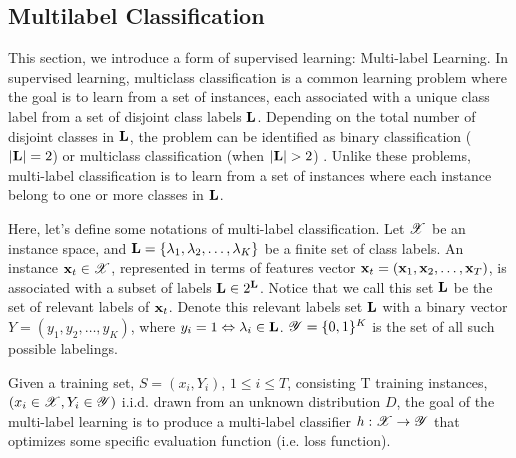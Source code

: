 \subsection{Multilabel Classification}
\label{subsec:multilabel}

This section, we introduce a form of supervised learning: Multi-label Learning. In supervised learning, multiclass classification is a common learning problem where the goal is to learn from a set of instances, each associated with a unique class label from a set of disjoint class labels $\mathbf{L}$. Depending on the total number of disjoint classes in $\mathbf{L}$, the problem can be identified as binary classification ($|\mathbf{L}| = 2$) or multiclass classification (when $|\mathbf{L}| >2$) . Unlike these problems, multi-label classification is to learn from a set of instances where each instance belong to one or more classes in $\mathbf{L}$. 

Here, let's define some notations of multi-label classification. Let $\mathscr{X}$ be an instance space, and $\mathbf{L} = \{ \lambda_1, \lambda_2, \dots, \lambda_K\}$ be a finite set of class labels. An instance $\mathbf{x}_t \in \mathscr{X}$, represented in terms of features vector $\mathbf{x}_t = (\mathbf{x}_1,\mathbf{x}_2,\dots,\mathbf{x}_T)$, is associated with a subset of labels $\mathbf{L}\in 2^{\mathbf{L}}$. Notice that we call this set $\mathbf{L}$ be the set of relevant labels of $\mathbf{x}_t$. Denote this relevant labels set $\mathbf{L}$ with a binary vector $Y = (y_1, y_2, \dots, y_K)$, where $y_i = 1 \Leftrightarrow \lambda_i\in \mathbf{L}$. $\mathscr{Y} = \{0,1\}^K$ is the set of all such possible labelings. 

Given a training set, $S = (x_i,Y_i)$, $1\leqslant i \leqslant T$, consisting T training instances, $\left( x_i\in \mathscr{X}, Y_i \in \mathscr{Y}\right)$ i.i.d. drawn from an unknown distribution $D$, the goal of the multi-label learning is to produce a multi-label classifier $h: \mathscr{X} \rightarrow \mathscr{Y} $ that optimizes some specific evaluation function (i.e. loss function). 

